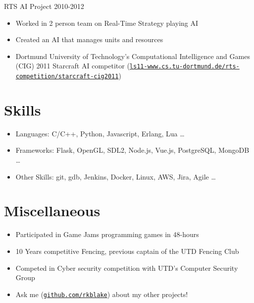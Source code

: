 \documentclass[line,margin]{res}
\begin{document}
\begin{resume}
\vspace{-8pt}
RTS AI Project
\hfill 2010-2012
\begin{itemize} \itemsep -2pt
	\item Worked in 2 person team on Real-Time Strategy playing AI
	\item Created an AI that manages units and resources
	\item Dortmund University of Technology’s Computational Intelligence and Games (CIG) 2011 Starcraft AI
	competitor (\href{http://ls11-www.cs.tu-dortmund.de/rts-competition/starcraft-cig2011}{\texttt{ls11-www.cs.tu-dortmund.de/rts-competition/starcraft-cig2011}})
\end{itemize}

\vspace{-4pt}
\section{Skills}
\vspace{22pt}
	\begin{itemize} \itemsep -2pt
		\item Languages: C/C++, Python, Javascript, Erlang, Lua \ldots
		\item Frameworks: Flask, OpenGL, SDL2, Node.js, Vue.js, PostgreSQL, MongoDB \ldots
		\item Other Skills: git, gdb, Jenkins, Docker, Linux, AWS, Jira, Agile \ldots
	\end{itemize}

\vspace{-4pt}
\section{Miscellaneous}
\vspace{22pt}
	\begin{itemize} \itemsep -2pt
	\item Participated in Game Jams programming games in 48-hours
	\item 10 Years competitive Fencing, previous captain of the UTD Fencing Club
	\item Competed in Cyber security competition with UTD's Computer Security Group
	\item Ask me (\href{https://github.com/rkblake}{\texttt{github.com/rkblake}}) about my other projects!
	\end{itemize}

\end{resume}
\end{document}
